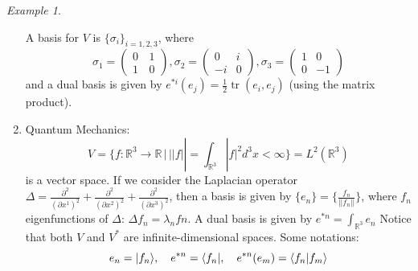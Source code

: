 \documentclass[a4paper,11pt,titlepage, article, oneside]{memoir}
\numberwithin{equation}{section}
\theoremstyle{definition}
\theoremstyle{remark}
\newtheorem{example}[theorem]{Example}
\DeclareMathOperator{\tr}{tr}
\newcommand{\rfield}{\mathbb{R}}
\begin{document}
\begin{tcolorbox}
\begin{example}
\begin{enumerate}
  A basis for $V$ is $\{\sigma_i\}_{i=1,2,3}$, where
  $$\sigma_1 = \left ( \begin{matrix}
  0\, &1 \\
  1\, &0
\end{matrix}
  \right), \sigma_2 = \left ( \begin{matrix}
  0 &i \\
  -i &0
\end{matrix}
  \right), \sigma_3 = \left ( \begin{matrix}
  1 &0 \\
  0 &-1
\end{matrix}
  \right)$$
  and a dual basis is given by $e^{*i}(e_j) = \frac{1}{2} \tr(e_i, e_j)$ (using the matrix product).
  \item Quantum Mechanics: $$V = \{ f \colon \rfield^3 \rightarrow \rfield \, | \, ||f|| = \int_{\rfield^3} |f|^2 d^3x < \infty \} = L^2(\rfield^3)$$ is a vector space. If we consider the Laplacian operator $\Delta = \frac{\partial^2}{(\partial x^1)^2} + \frac{\partial^2}{(\partial x^2)^2} + \frac{\partial^2}{(\partial x^3)^2}$, then a basis is given by $\{e_n\} = \{\frac{f_n}{||f_n||}\}$, where $f_n$ eigenfunctions of $\Delta$: $\Delta f_n = \lambda_n fn$.
  A dual basis is given by $e^{*n} = \int_{\rfield^3} e_n$
  Notice that both $V$ and $V^*$ are infinite-dimensional spaces.
  Some notations:
  $$e_n = |f_n \rangle,\quad e^{*n} = \langle f_n |,\quad e^{*n}(e_m) = \braket{f_n | f_m}$$
  \end{enumerate}
\end{example}\end{tcolorbox}
\end{document}
